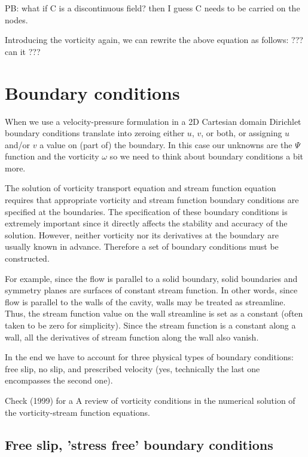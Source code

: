 PB: what if C is a discontinuous field? then I guess C needs to be carried on the nodes.

Introducing the vorticity again, 
we can rewrite the above equation as follows: ??? can it ???





\section{Boundary conditions}

When we use a velocity-pressure formulation in a 2D Cartesian domain Dirichlet boundary conditions 
translate into zeroing either $u$, $v$, or both, or assigning $u$ and/or $v$ a value on 
(part of) the boundary. In this case our unknowns are the $\Psi$ function and the vorticity $\omega$ 
so we need to think about boundary conditions a bit more.

The solution of vorticity transport equation and stream function equation requires that appropriate
vorticity and stream function boundary conditions are specified at the boundaries. The specification
of these boundary conditions is extremely important since it directly affects the stability and accuracy
of the solution. However, neither vorticity nor its derivatives at the boundary
are usually known in advance. Therefore a set of boundary conditions must be constructed.

For example, since the flow is parallel to a solid boundary, solid boundaries and symmetry planes
are surfaces of constant stream function. In other words, since flow is parallel to the walls of the cavity, walls may be treated as streamline. Thus, the stream function value on the wall streamline is set as a constant (often taken to be zero for simplicity). Since the stream function is a constant along a wall, all the derivatives of stream function along the wall also vanish.

In the end we have to account for three physical types of boundary conditions:
free slip, no slip, and prescribed velocity (yes, technically the last one encompasses the second one).

Check \textcite{napq99} (1999) for a A review of vorticity conditions in the numerical solution of the vorticity-stream function equations.

\subsection{Free slip, 'stress free' boundary conditions}

